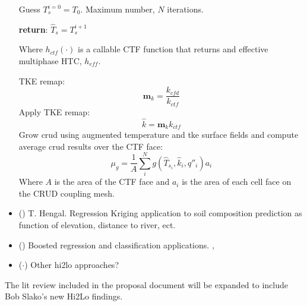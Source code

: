\begin{itemize}
    \begin{algorithm}[H]
    Guess $T^{i=0}_s=T_0$.  Maximum number, $N$ iterations.
    
	\textbf{return}: $\hat T_s = T^{i+1}_s$
	\end{algorithm}
    Where $h_{ctf}(\cdot)$ is a callable CTF function that returns and effective multiphase HTC, $h_{eff}$.
    
    TKE remap:
    \begin{equation}
       \mathbf m_{k} = \frac{k_{cfd}}{k_{ctf}}
    \end{equation}
    Apply TKE remap:
       \begin{equation}
       \hat k = \mathbf m_k k_{ctf}
       \end{equation}
     Grow crud using augmented temperature and tke surface fields and compute average crud results over the CTF face:
     \begin{equation}
     \mu_g = \frac{1}{A} \sum_i^N g(\hat T_{s_i}, \hat k_i, q''_i) a_i
     \end{equation}
    Where $A$ is the area of the CTF face and $a_i$ is the area of each cell face on the CRUD coupling mesh.
    \item (\checkmark) T. Hengal. Regression Kriging application to soil composition prediction as function of elevation, distance to river, ect. \cite{Hengl07}
    \item (\checkmark) Boosted regression and classification applications. \cite{moisen2006}, \cite{friedman2002}
    \item ($\cdot$) Other hi2lo approaches?
\end{itemize}

The lit review included in the proposal document will be expanded to include Bob Slako's new Hi2Lo findings.
